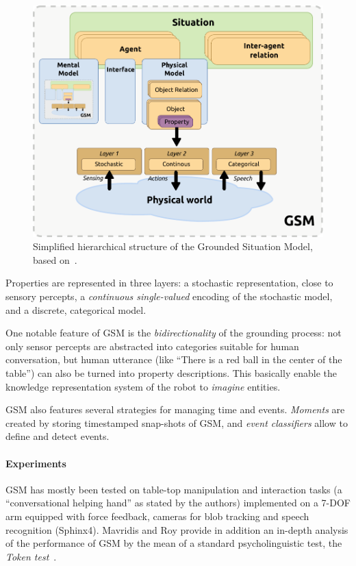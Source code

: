 \documentclass[a4paper]{article}
\begin{document}
\begin{figure}[!h]
    \centering
    \includegraphics[width=0.65\columnwidth]{images/gsm.pdf}

    \caption{Simplified hierarchical structure of the Grounded Situation Model,
    based on~\cite{Mavridis2006}.}

    \label{fig|gsm}
\end{figure}

Properties are represented in three layers: a stochastic representation, close
to sensory percepts, a \emph{continuous single-valued} encoding of the
stochastic model, and a discrete, categorical model.

One notable feature of GSM is the \emph{bidirectionality} of the grounding
process: not only sensor percepts are abstracted into categories suitable for
human conversation, but human utterance (like ``There is a red ball in the
center of the table'') can also be turned into property descriptions. This
basically enable the knowledge representation system of the robot to
\emph{imagine} entities.

GSM also features several strategies for managing time and events.
\emph{Moments} are created by storing timestamped snap-shots of GSM, and
\emph{event classifiers} allow to define and detect events.

\paragraph{Experiments} GSM has mostly been tested on table-top manipulation
and interaction tasks (a ``conversational helping hand'' as stated by the
authors) implemented on a 7-DOF arm equipped with force feedback, cameras for blob
tracking and speech recognition (Sphinx4). Mavridis and Roy provide in addition
an in-depth analysis of the performance of GSM by the mean of a standard
psycholinguistic test, the \emph{Token test}~\cite{DiSimoni1978}.
\end{document}
